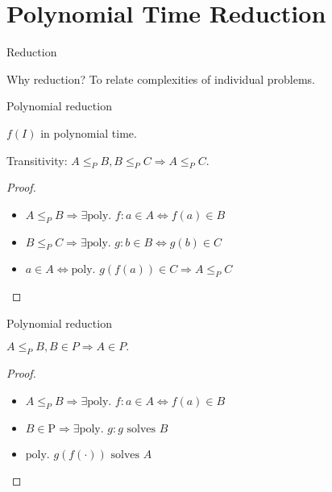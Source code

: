 \section{Polynomial Time Reduction}

\begin{frame}{Reduction}
  \begin{alertblock}{Why reduction?}
    To relate complexities of individual problems.
  \end{alertblock}

  \vspace{0.40cm}
  \begin{definition}[Reduction.]
  \end{definition}
\end{frame}
\begin{frame}{Polynomial reduction}
  \begin{definition}
    $f(I)$ in polynomial time.
  \end{definition}
  
  \begin{theorem}
    Transitivity: $A \le_{P} B, B \le_{P} C \Rightarrow A \le_{P} C.$
  \end{theorem}

  \begin{proof}
    \begin{itemize}
      \item $A \le_{P} B \Rightarrow \exists \text{poly. } f: a \in A \iff f(a) \in B$
      \item $B \le_{P} C \Rightarrow \exists \text{poly. } g: b \in B \iff g(b) \in C$
      \item $a \in A \iff \text{poly. } g(f(a)) \in C \Rightarrow A \le_{P} C$
    \end{itemize}
  \end{proof}
\end{frame}
\begin{frame}{Polynomial reduction}
  \begin{theorem}
    $A \le_{P} B, B \in P \Rightarrow A \in P.$  
  \end{theorem}

  \begin{proof}
    \begin{itemize}
      \item $A \le_{P} B \Rightarrow \exists \text{poly. } f: a \in A \iff f(a) \in B$
      \item $B \in \text{P} \Rightarrow \exists \text{poly. } g: g \text{ solves } B$
      \item $\text{poly. } g(f(\cdot)) \text{ solves } A$
    \end{itemize}
  \end{proof}
\end{frame}

